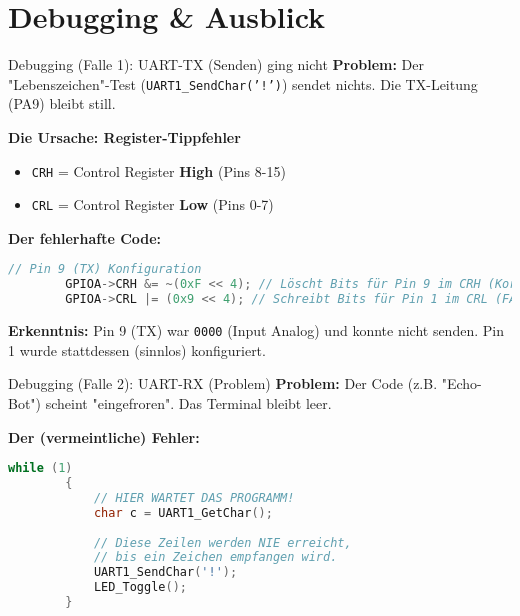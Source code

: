 \documentclass{beamer}
\begin{document}
\section{Debugging \& Ausblick}

\begin{frame}[fragile]{Debugging (Falle 1): UART-TX (Senden) ging nicht}
	\textbf{Problem:} Der "Lebenszeichen"-Test (\texttt{UART1\_SendChar('!')}) sendet nichts. Die TX-Leitung (PA9) bleibt still.
	
	\bigskip
	\textbf{Die Ursache: Register-Tippfehler}
	\begin{itemize}
		\item \texttt{CRH} = Control Register \textbf{High} (Pins 8-15)
		\item \texttt{CRL} = Control Register \textbf{Low} (Pins 0-7)
	\end{itemize}
	
	\bigskip
	\textbf{Der fehlerhafte Code:}
	\begin{lstlisting}[language=C, style=mystyle]
		// Pin 9 (TX) Konfiguration
		GPIOA->CRH &= ~(0xF << 4); // Löscht Bits für Pin 9 im CRH (Korrekt)
		GPIOA->CRL |= (0x9 << 4); // Schreibt Bits für Pin 1 im CRL (FATALER FEHLER!)
	\end{lstlisting}
	
	\medskip
	\textbf{Erkenntnis:} Pin 9 (TX) war \texttt{0000} (Input Analog) und konnte nicht senden. Pin 1 wurde stattdessen (sinnlos) konfiguriert.
\end{frame}


\begin{frame}[fragile]{Debugging (Falle 2): UART-RX (Problem)}
	\textbf{Problem:} Der Code (z.B. "Echo-Bot") scheint "eingefroren". Das Terminal bleibt leer.
	
	\bigskip
	\textbf{Der (vermeintliche) Fehler:}
	\begin{lstlisting}[language=C, style=mystyle]
		while (1)
		{
			// HIER WARTET DAS PROGRAMM!
			char c = UART1_GetChar(); 
			
			// Diese Zeilen werden NIE erreicht,
			// bis ein Zeichen empfangen wird.
			UART1_SendChar('!'); 
			LED_Toggle();
		}
	\end{lstlisting}
\end{frame}
\end{document}

